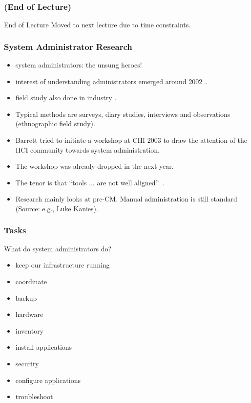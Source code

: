 \begin{frame}
	\frametitle{(End of Lecture)}

	\begin{alertblock}{End of Lecture}
	Moved to next lecture due to time constraints.
	\end{alertblock}
\end{frame}


\begin{frame}
	\frametitle{System Administrator Research}

	\begin{itemize}[<+-| alert@+>]
	\item system administrators: the unsung heroes!
	\item interest of understanding administrators emerged around 2002~\cite{anderson2002researching}.
	\item field study also done in industry \cite{barrett2004field}.
	\item Typical methods are surveys, diary studies, interviews and observations (ethnographic field study).
	\item Barrett \cite{barrett2003system} tried to initiate a workshop at CHI 2003 to draw the attention of the HCI community towards system administration.
	\item The workshop was already dropped in the next year.
	\item The tenor is that ``tools ... are not well aligned''~\cite{haber2007design}.
	\item Research mainly looks at pre-CM. Manual administration is still standard (Source: e.g., Luke Kanies).
	\end{itemize}
\end{frame}

\begin{frame}
	\frametitle{Tasks}

	What do system administrators do?

	\begin{itemize}[<+-| alert@+>]
	\item keep our infrastructure running
	\item coordinate
	\item backup
	\item hardware
	\item inventory
	\item install applications
	\item security
	\item configure applications
	\item troubleshoot
	\end{itemize}
\end{frame}


